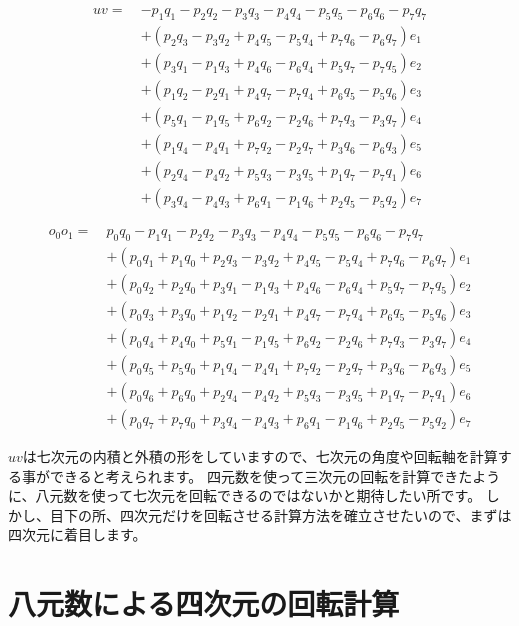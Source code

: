 \documentclass[a4paper,12pt]{jsreport}
\begin{document}
\begin{equation}
\begin{split}
uv=~&-p_1q_1-p_2q_2-p_3q_3-p_4q_4-p_5q_5-p_6q_6-p_7q_7\\
&+(p_2q_3-p_3q_2+p_4q_5-p_5q_4+p_7q_6-p_6q_7)e_1\\
&+(p_3q_1-p_1q_3+p_4q_6-p_6q_4+p_5q_7-p_7q_5)e_2\\
&+(p_1q_2-p_2q_1+p_4q_7-p_7q_4+p_6q_5-p_5q_6)e_3\\
&+(p_5q_1-p_1q_5+p_6q_2-p_2q_6+p_7q_3-p_3q_7)e_4\\
&+(p_1q_4-p_4q_1+p_7q_2-p_2q_7+p_3q_6-p_6q_3)e_5\\
&+(p_2q_4-p_4q_2+p_5q_3-p_3q_5+p_1q_7-p_7q_1)e_6\\
&+(p_3q_4-p_4q_3+p_6q_1-p_1q_6+p_2q_5-p_5q_2)e_7
\end{split}
\end{equation}

\begin{equation}
\begin{split}
o_0o_1=~&p_0q_0-p_1q_1-p_2q_2-p_3q_3-p_4q_4-p_5q_5-p_6q_6-p_7q_7\\
&+(p_0q_1+p_1q_0+p_2q_3-p_3q_2+p_4q_5-p_5q_4+p_7q_6-p_6q_7)e_1\\
&+(p_0q_2+p_2q_0+p_3q_1-p_1q_3+p_4q_6-p_6q_4+p_5q_7-p_7q_5)e_2\\
&+(p_0q_3+p_3q_0+p_1q_2-p_2q_1+p_4q_7-p_7q_4+p_6q_5-p_5q_6)e_3\\
&+(p_0q_4+p_4q_0+p_5q_1-p_1q_5+p_6q_2-p_2q_6+p_7q_3-p_3q_7)e_4\\
&+(p_0q_5+p_5q_0+p_1q_4-p_4q_1+p_7q_2-p_2q_7+p_3q_6-p_6q_3)e_5\\
&+(p_0q_6+p_6q_0+p_2q_4-p_4q_2+p_5q_3-p_3q_5+p_1q_7-p_7q_1)e_6\\
&+(p_0q_7+p_7q_0+p_3q_4-p_4q_3+p_6q_1-p_1q_6+p_2q_5-p_5q_2)e_7
\end{split}
\end{equation}

$uv$は七次元の内積と外積の形をしていますので、七次元の角度や回転軸を計算する事ができると考えられます。
四元数を使って三次元の回転を計算できたように、八元数を使って七次元を回転できるのではないかと期待したい所です。
しかし、目下の所、四次元だけを回転させる計算方法を確立させたいので、まずは四次元に着目します。

\section{八元数による四次元の回転計算}
\end{document}
